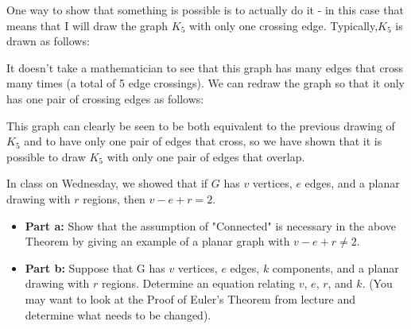 \documentclass{article}
\begin{document}
\begin{solution}
One way to show that something is possible is to actually do it - in this case that means that I will draw the graph $K_5$ with only one crossing edge.  Typically,$K_5$ is drawn as follows:
\vskip 0.15in \noindent
{}
\vskip 0.15in \noindent
It doesn't take a mathematician to see that this graph has many edges that cross many times (a total of 5 edge crossings). We can redraw the graph so that it only has one pair of crossing edges as follows:
\vskip 0.15in \noindent
{}
\vskip 0.15in \noindent
This graph can clearly be seen to be both equivalent to the previous drawing of $K_5$ and to have only one pair of edges that cross, so we have shown that it is possible to draw $K_5$ with only one pair of edges that overlap.
\end{solution}


\begin{problem} In class on Wednesday, we showed that if $G$ has $v$ vertices, $e$ edges, and a planar drawing with $r$ regions, then $v-e+r=2$.
\begin{itemize}
	\item[]{\textbf{Part a:}} Show that the assumption of "Connected" is necessary in the above Theorem by giving an example of a planar graph with $v-e+r \neq 2$.
	\item[]{\textbf{Part b:}} Suppose that G has $v$ vertices, $e$ edges, $k$ components, and a planar drawing with $r$ regions.  Determine an equation relating $v$, $e$, $r$, and $k$. (You may want to look at the Proof of Euler's Theorem from lecture and determine what needs to be changed).
\end{itemize}
\end{problem}
\end{document}
